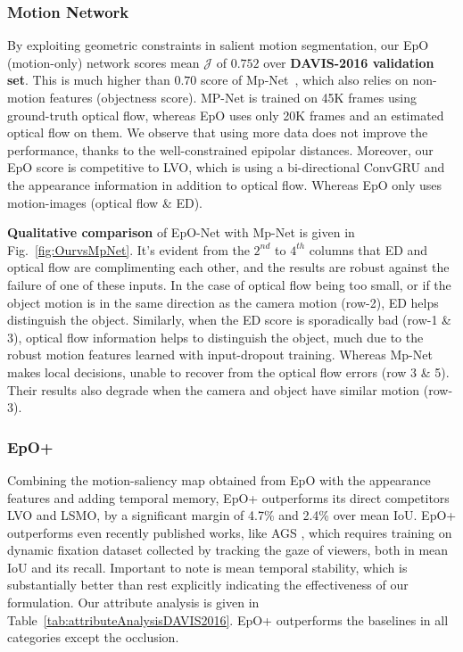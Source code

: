 \documentclass[10pt,twocolumn,letterpaper]{article}
\newcommand{\rowSpace}{\vspace{-0.4cm}}
\begin{document}
\vspace{-0.25cm}

\subsubsection{Motion Network} 
By exploiting geometric constraints in salient motion segmentation, our EpO (motion-only) network scores mean $\mathcal{J}$ of $0.752$ over \textbf{DAVIS-2016 validation set}. 
This is much higher than $0.70$ score of Mp-Net~\cite{MpNet}, which also relies on non-motion features (objectness score). MP-Net is trained on 45K frames using ground-truth optical flow, whereas EpO uses only 20K frames and an estimated optical flow on them. We observe that using more data does not improve the performance, thanks to the well-constrained epipolar distances. Moreover, our EpO score is competitive to LVO, which is using a bi-directional ConvGRU and the appearance information in addition to optical flow. Whereas EpO only uses motion-images (optical flow \& ED). 

\textbf{Qualitative comparison} of EpO-Net with Mp-Net is given in Fig.~\ref{fig:OurvsMpNet}. 
It's evident from the $2^{nd}$ to $4^{th}$ columns that ED and optical flow are complimenting each other, and the results are robust against the failure of one of these inputs.
In the case of optical flow being too small, or if the object motion is in the same direction as the camera motion (row-2), ED helps distinguish the object. 
Similarly, when the ED score is sporadically bad (row-1 \& 3), optical flow information helps to distinguish the object, much due to the robust motion features learned with input-dropout training.
Whereas Mp-Net makes local decisions, unable to recover from the optical flow errors (row 3 \& 5). Their results also degrade when the camera and object have similar motion (row-3).  
\rowSpace

\subsubsection{EpO+}
Combining the motion-saliency map obtained from EpO with the appearance features and adding temporal memory, EpO+ outperforms its direct competitors LVO and LSMO, by a significant margin of 4.7\% and 2.4\% over mean IoU. 
EpO+ outperforms even recently published works, like AGS \cite{ags}, which requires training on dynamic fixation dataset collected by tracking the gaze of viewers, both in mean IoU and its recall. 
Important to note is mean temporal stability, which is substantially better than rest explicitly indicating the effectiveness of our formulation. 
Our attribute analysis is given in Table~\ref{tab:attributeAnalysisDAVIS2016}. EpO+ outperforms the baselines in all categories except the occlusion.
\end{document}
